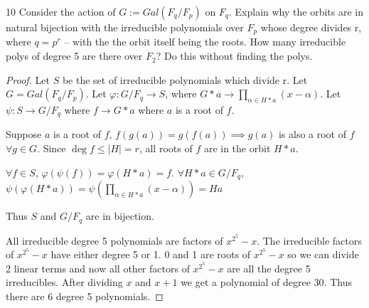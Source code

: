 \documentclass{article}
\begin{document}
\begin{PROB}{10}\label{Problem 10.}
    Consider the action of $G := Gal(F_q/F_p)$ on $F_q$. Explain why the orbits are in natural bijection with the irreducible polynomials over $F_p$ whose degree divides r, where $q = p^r$  -- with the the orbit itself being the roots. How many irreducible polys of degree 5 are there over $F_2$?  Do this without finding the polys. 
\end{PROB}
\begin{proof}
    Let $S$ be the set of irreducible polynomials which divide r. Let $G = Gal(F_q / F_p)$. 
    Let $\varphi: G / F_q \to S$, where $G * a \to \prod_{\alpha \in H * a} (x - \alpha)$. Let $\psi: S \to G / F_q$ where $f \to G * a$ where $a$ is a root of $f$. 
    
    Suppose $a$ is a root of $f$, $f(g(a)) = g(f(a)) \implies g(a)$ is also a root of $f$ $\forall g \in G$. Since $\deg f \leq |H| = r $, all roots of $f$ are in the orbit $H * a$.         
    
    $\forall f \in S$, $\varphi(\psi(f)) = \varphi( H * a) = f$. $\forall H * a \in G / F_q$, $\psi(\varphi(H * a)) = \psi(\prod_{\alpha \in H * a} (x - \alpha)) = Ha$
    
    Thus $S$ and $G / F_q$ are in bijection. 
    
    
    All irreducible degree 5 polynomials are factors of $x^{2^5} - x$. The irreducible factors of $x^{2^5} - x$ have either degree 5 or 1. 0 and 1 are roots of $x^{2^5} - x$ so we can divide 2 linear terms and now all other factors of $x^{2^5} - x$ are all the degree 5 irreducibles. After dividing $x$ and $x + 1$ we get a polynomial of degree 30. Thus there are 6 degree 5 polynomials.    
\end{proof}

    
\end{document}
